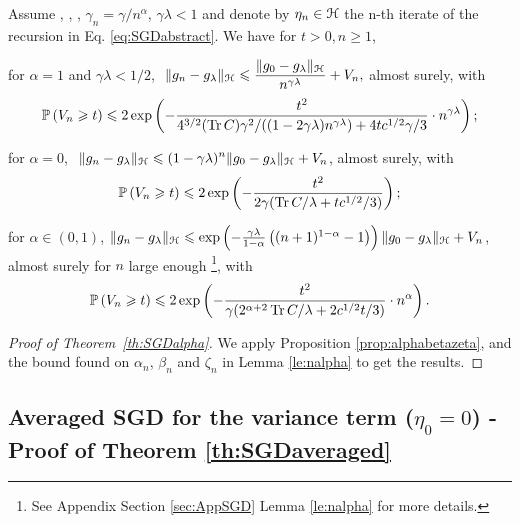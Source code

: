 \begin{proposition}[SGD, decreasing step size: $\gamma_n = \gamma/n^\alpha$]
\label{prop:fullalpha}
Assume , , , $\gamma_n = \gamma/n^\alpha$, $\gamma\lambda < 1$ and denote by $\eta_n \in {\mathcal H}$ the n-th iterate of the recursion in Eq. \eqref{eq:SGDabstract}. We have for $t > 0, n \geqslant 1$,
\BIT
\item for $\alpha = 1$ and $\gamma\lambda < 1/2$, $\displaystyle \ \|g_n - g_\lambda\|_{\mathcal H} \leqslant \frac{\|g_0 - g_\lambda\|_{\mathcal H}}{n^{\gamma\lambda}}  +V_n,$ almost surely, with
 \begin{align*}
{\mathbb P} \left(V_n  \geqslant t\right) \leqslant 2\exp\left(-\frac{t^2}{4^{3/2}(\operatorname{Tr} C) \gamma^2/((1-2\gamma\lambda) n ^{\gamma\lambda}) +4tc^{1/2}\gamma/3  }\cdot n^{\gamma\lambda}\right);
\end{align*}
\item for $\alpha = 0$, $\displaystyle \ \|g_n - g_\lambda\|_{\mathcal H} \leqslant (1-\gamma\lambda)^n \|g_0 - g_\lambda\|_{\mathcal H} + V_n$, almost surely, with
$${\mathbb P} \left( V_n \geqslant t \right) \leqslant 
2\exp\left( -\frac{t^2}{2\gamma(\operatorname{Tr} C  / \lambda + t c^{1/2} / 3 )}\right);$$

\item for $\alpha \in (0,1)$, $\|g_n - g_\lambda\|_{\mathcal H} \leqslant \exp\left(  -\frac{\gamma\lambda}{1-\alpha}\left( (n+1)^{1-\alpha} -1  \right)   \right) \|g_0 - g_\lambda\|_{\mathcal H} + V_n$, almost surely for $n$ large enough \footnote {See Appendix Section \ref{sec:AppSGD} Lemma \ref{le:nalpha} for more details.}, with
$${\mathbb P} \left( V_n \geqslant t \right) \leqslant 2\exp\left( -\frac{ t^2 }{ \gamma (2 ^{\alpha + 2} \operatorname{Tr} C/\lambda  + 2 c^{1/2}t  / 3)}\cdot n^{\alpha}\right).$$
\EIT
\end{proposition}

\begin{proof}[Proof of Theorem~\ref{th:SGDalpha}]
We apply Proposition \ref{prop:alphabetazeta}, and the bound found on $\alpha_n$, $\beta_n$ and $\zeta_n$ in Lemma \ref{le:nalpha} to get the results.
\end{proof}



\subsection{Averaged SGD for the variance term \texorpdfstring{($\eta_0 = 0$)}{} - Proof of Theorem \ref{th:SGDaveraged}}
\label{ap:SGDaverage}

